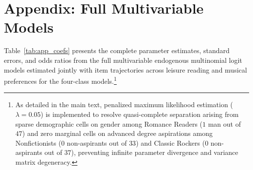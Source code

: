 \documentclass[12pt]{article}
\begin{document}



\newpage
\appendix
\section*{Appendix: Full Multivariable Models}
\setcounter{table}{0}
\renewcommand{\thetable}{A\arabic{table}}

Table~\ref{tab:app_coefs} presents the complete parameter estimates, standard errors, and odds ratios from the full multivariable endogenous multinomial logit models estimated jointly with item trajectories across leisure reading and musical preferences for the four-class models.\footnote{As detailed in the main text, penalized maximum likelihood estimation ($\lambda = 0.05$) is implemented to resolve quasi-complete separation arising from sparse demographic cells on gender among Romance Readers ($1$ man out of $47$) and zero marginal cells on advanced degree aspirations among Nonfictionists ($0$ non-aspirants out of $33$) and Classic Rockers ($0$ non-aspirants out of $37$), preventing infinite parameter divergence and variance matrix degeneracy.}
\end{document}
